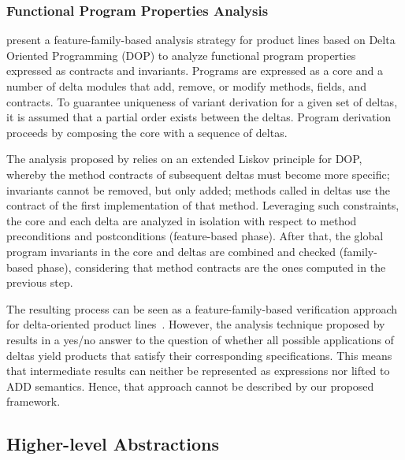 


\subsubsection{Functional Program Properties Analysis}
\label{sec:instance-delta-liskov}

\citet{DOPTheo} present a feature-family-based analysis strategy for product lines based on Delta Oriented 
Programming (DOP) to analyze functional program properties expressed as contracts and invariants. Programs are expressed as a core and a number of delta modules that add, remove, or modify methods, 
fields, and contracts. To guarantee uniqueness of variant derivation for a given set of deltas, it is assumed that 
a partial order exists between the deltas. Program derivation proceeds by composing the core with a sequence of deltas. 

The analysis proposed by \citet{DOPTheo} relies on an extended Liskov principle for DOP, whereby the method contracts of subsequent deltas 
must become more specific; invariants cannot be removed, but only added; methods called in deltas use the 
contract of the first implementation of that method.
Leveraging such constraints, the core and each delta are analyzed in isolation 
with respect to method preconditions and postconditions (feature-based phase).
After that, the global program invariants in the core and deltas are combined and
checked (family-based phase), considering that method contracts are the ones
computed in the previous step.

The resulting process can be seen as a feature-family-based verification
approach for delta-oriented product lines~\cite{Thum2014}.
However, the analysis technique proposed by \citet{DOPTheo} results in a yes/no
answer to the question of whether all possible applications of deltas yield
products that satisfy their corresponding specifications.
This means that intermediate results can neither be represented as expressions nor
lifted to ADD semantics.
Hence, that approach cannot be described by our proposed framework.




\subsection{Higher-level Abstractions}

